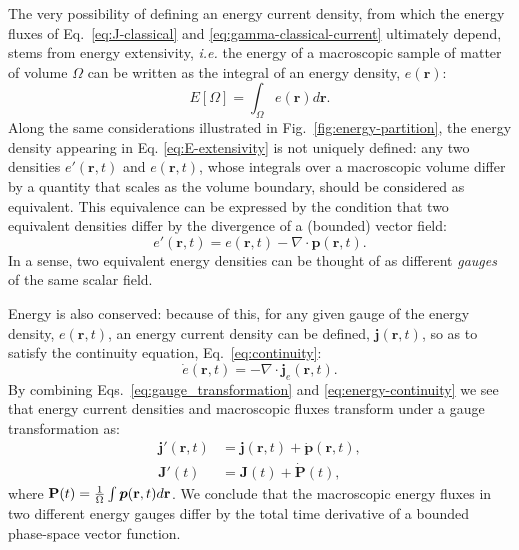 The very possibility of defining an energy current density, from which the energy fluxes of Eq.~\eqref{eq:J-classical} and \eqref{eq:gamma-classical-current} ultimately depend, stems from energy extensivity, \emph{i.e.} the energy of a macroscopic sample of matter of volume $\Omega$ can be written as the integral of an energy density, $e(\mathbf{r})$:
\begin{equation}
  E[\Omega]=\int_{\Omega}e(\mathbf{r})d\mathbf{r}. \label{eq:E-extensivity}
\end{equation}
Along the same considerations illustrated in Fig.~\ref{fig:energy-partition}, the energy density appearing in Eq. \eqref{eq:E-extensivity} is not uniquely defined:  any 
two densities $e'(\mathbf{r},t)$ and $e(\mathbf{r},t)$, whose integrals over a macroscopic volume differ by a quantity that scales as the volume boundary, should be considered as equivalent. 
This equivalence can be expressed by the condition that two equivalent densities differ by the divergence of a (bounded) vector field:
\begin{equation}
  e'(\mathbf{r},t)=e(\mathbf{r},t) - \nabla\cdot \bm{p}(\mathbf{r},t). \label{eq:gauge_transformation}
\end{equation}
In a sense, two equivalent energy densities can be thought of as different \emph{gauges} of the same scalar field. 

Energy is also conserved: because of this, for any given gauge of the energy density, $e(\mathbf{r},t)$, an energy current density can be defined, $\bm{j}(\mathbf{r},t)$, so as to satisfy the continuity equation, Eq.~\eqref{eq:continuity}:
\begin{equation}
  \dot{e}(\mathbf{r},t)=-\nabla\cdot
  \mathbf{j}_{e}(\mathbf{r},t). \label{eq:energy-continuity} 
\end{equation}
By combining Eqs.~\eqref{eq:gauge_transformation} and \eqref{eq:energy-continuity} we see that energy current densities and macroscopic fluxes transform under a gauge transformation as:
\begin{align}
 \bm{j}'(\mathbf{r},t) & = \bm{j}(\mathbf{r},t) + \dot{\bm{p}}(\mathbf{r},t), \label{eq:current_density_gauge} \\
  \mathbf{J}'(t) & = \mathbf{J}(t) + \dot{\mathbf{P}}(t), \label{eq:macroscopic_flux_gauge}
\end{align}
where $\mathbf{P}(t)=\frac{1}{{\mathrm\Omega}} \int\bm{p}(\mathbf{r},t)d\mathbf{r}$. We
conclude that the macroscopic energy fluxes in two different energy gauges differ by the total time derivative of a bounded phase-space vector function.

